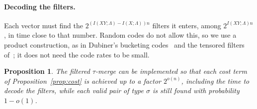 \documentclass[11pt]{article}
\newtheorem{proposition}[theorem]{Proposition}
\theoremstyle{definition}
\theoremstyle{remark}
\begin{document}
\paragraph{Decoding the filters.} Each vector must find the $2^{(I(XY;\Lambda)-I(X;\Lambda))n}$ filters it enters,
among $2^{I(XY;\Lambda)n}$, in time close to that number. Random codes do not allow this, so we use a product
construction, as in Dubiner's bucketing codes~\cite{Dub10} and the tensored filters of~\cite{BDGL16}; it does not
need the code rates to be small.

\begin{proposition}\label{prop:decode}
The filtered $\tau$-merge can be implemented so that each cost term of Proposition~\ref{prop:cost} is achieved up to
a factor $2^{o(n)}$, including the time to decode the filters, while each valid pair of type $\sigma$ is still found
with probability $1-o(1)$.
\end{proposition}
\end{document}

